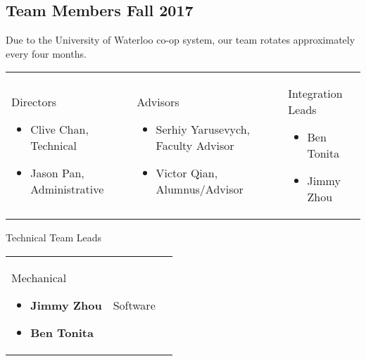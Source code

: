\documentclass[main.tex]{subfiles}
\begin{document}
\subsection{Team Members Fall 2017}
Due to the University of Waterloo co-op system, our team rotates approximately every four months.

\begin{flushleft}
\begin{tabularx}{\linewidth}{@{}XXX@{}}
	\begin{center}\large{Directors}\end{center}
    \begin{itemize}[label={},noitemsep]
        \item Clive Chan, Technical
        \item Jason Pan, Administrative
    \end{itemize}
    &
    \begin{center}\large{Advisors}\end{center}
    \begin{itemize}[label={},noitemsep]
        \item Serhiy Yarusevych, Faculty Advisor
        \item Victor Qian, Alumnus/Advisor
    \end{itemize}
    &
    \begin{center}\large{Integration Leads}\end{center}
    \begin{itemize}[label={},noitemsep]
        \item Ben Tonita
        \item Jimmy Zhou
    \end{itemize}
\end{tabularx}
\begin{center}\large{Technical Team Leads}\end{center}
\begin{tabularx}{\linewidth}{@{}XXX@{}}
    \begin{center}\large{Mechanical}\end{center}
    \begin{itemize}[label={},noitemsep]
    \item \textbf{Jimmy Zhou}
    \item \textbf{Ben Tonita}
    \end{itemize}
    &
    \begin{center}\large{Software}\end{center}
    \begin{itemize}[label={},noitemsep]

\end{itemize}
\end{tabularx}
\end{flushleft}
\end{document}
